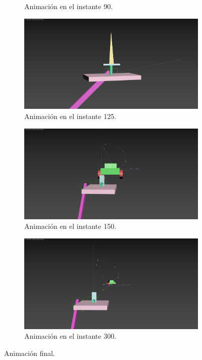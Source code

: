 \begin{figure}[H]
\begin{subfigure}[t]{0.48\textwidth}
        \caption{Animación en el instante 90.}
    \end{subfigure}
    \hfill
    \begin{subfigure}[t]{0.48\textwidth}
        \centering
        \includegraphics[width=\textwidth]{imagenes/resultado/125.png}
        \caption{Animación en el instante 125.}
    \end{subfigure}
    \hfill
    \begin{subfigure}[t]{0.48\textwidth}
        \centering
        \includegraphics[width=\textwidth]{imagenes/resultado/150.png}
        \caption{Animación en el instante 150.}
    \end{subfigure}
    \hfill
    \begin{subfigure}[t]{0.48\textwidth}
        \centering
        \includegraphics[width=\textwidth]{imagenes/resultado/300.png}
        \caption{Animación en el instante 300.}
    \end{subfigure}
    \caption{Animación final.}
\end{figure}